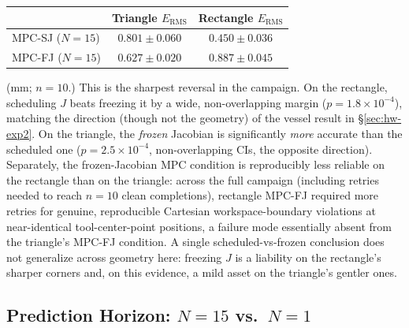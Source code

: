 \documentclass[journal]{IEEEtran}
\begin{document}
\begin{center}
\begin{tabular}{@{}lcc@{}}
\toprule
& Triangle $E_{\mathrm{RMS}}$ & Rectangle $E_{\mathrm{RMS}}$ \\
\midrule
MPC-SJ ($N{=}15$) & $0.801\pm0.060$ & $0.450\pm0.036$ \\
MPC-FJ ($N{=}15$) & $0.627\pm0.020$ & $0.887\pm0.045$ \\
\bottomrule
\end{tabular}
\end{center}
(mm; $n=10$.) This is the sharpest reversal in the campaign. On the
rectangle, scheduling $J$ beats freezing it by a wide, non-overlapping
margin ($p=1.8\times10^{-4}$), matching the direction (though not the
geometry) of the vessel result in \S\ref{sec:hw-exp2}. On the triangle,
the \emph{frozen} Jacobian is significantly \emph{more} accurate than
the scheduled one ($p=2.5\times10^{-4}$, non-overlapping CIs, the
opposite direction). Separately, the frozen-Jacobian MPC condition is
reproducibly less reliable on the rectangle than on the triangle: across
the full campaign (including retries needed to reach $n=10$ clean
completions), rectangle MPC-FJ required more retries for genuine,
reproducible Cartesian workspace-boundary violations at near-identical
tool-center-point positions, a failure mode essentially absent from the
triangle's MPC-FJ condition. A single scheduled-vs-frozen conclusion does
not generalize across geometry here: freezing $J$ is a liability on the
rectangle's sharper corners and, on this evidence, a mild asset on the
triangle's gentler ones.

\subsection{Prediction Horizon: $N{=}15$ vs.\ $N{=}1$}
\label{sec:shape-horizon}
\end{document}
